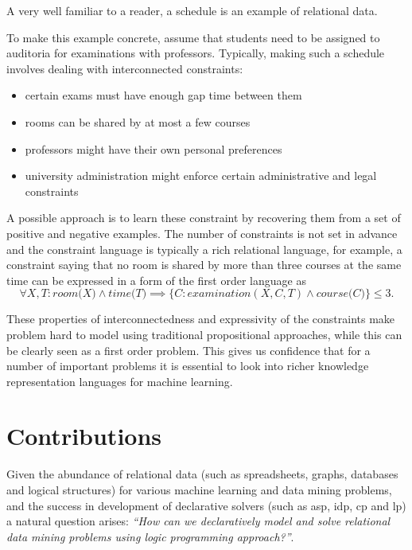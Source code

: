 A very well familiar to a reader, a schedule is an example
of relational data. 
\begin{example}
To make this example concrete, assume that students need to be assigned to
auditoria for examinations with professors. Typically, making such a
schedule involves dealing with interconnected constraints:
    \begin{itemize} 
    \item certain exams
must have enough gap time between them 
    \item rooms can be shared by at most
    a few courses 
\item professors might have their own personal preferences
\item university administration might enforce certain administrative and 
legal constraints 
    \end{itemize} 
    
    A possible approach is to learn these 
constraint by recovering them from
a set of positive and negative examples. The number of constraints is
not set in advance and the constraint language is typically a rich
relational language, for example, a constraint saying that no room is
shared by more than three courses at the same time can be expressed in a form of the first
order language as
\begin{equation*}
    \forall X,T: \textit{room(X)} \wedge \textit{time(T)} \implies \{ C : \textit{examination}(X,C,T) \wedge \textit{course(C)} \} \leq 3.
\end{equation*}
\end{example}

These properties of interconnectedness and expressivity of the constraints make
problem hard to model using traditional propositional approaches,
while this can be clearly seen as a first order problem. This gives us
confidence that for a number of important problems it is essential to
look into richer knowledge representation languages for machine
learning.

\section{Contributions}
Given the abundance of relational data (such as spreadsheets, graphs,
databases and logical structures) for various machine learning and data
mining problems, and the success in development of declarative solvers (such
as \acrshort{asp}, \acrshort{idp}, \acrshort{cp} and \acrshort{lp}) a
natural question arises: \textit{``How can we declaratively model and
solve relational data mining problems using logic programming approach?''}. 

